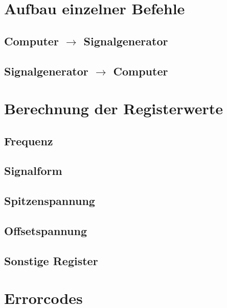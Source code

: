 \documentclass[a4paper,12pt]{article}
\begin{document}
\bigskip
\bigskip
\bigskip
\bigskip

\section{Aufbau einzelner Befehle}
\subsection{Computer $\rightarrow$ Signalgenerator}
\subsection{Signalgenerator $\rightarrow$ Computer}
\section{Berechnung der Registerwerte}
\subsection{Frequenz}
\subsection{Signalform}
\subsection{Spitzenspannung}
\subsection{Offsetspannung}
\subsection{Sonstige Register}
\section{Errorcodes}
\end{document}
